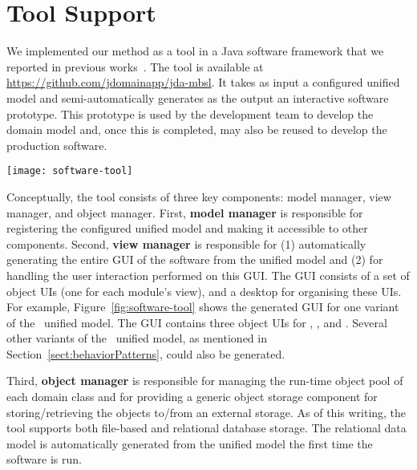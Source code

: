 \section{Tool Support}
\label{sect:tool} %

We implemented our method as a tool in a Java software framework that we reported in previous works~\cite{le_domain_2018, le_jdomainapp_2017}. The tool is available at \url{https://github.com/jdomainapp/jda-mbsl}. It takes as input a configured unified model and semi-automatically generates as the output an interactive software prototype. This prototype is used by the development team to develop the domain model and, once this is completed, may also be reused to develop the production software.

\begin{figure*}[ht]
	\centering
	\texttt{[image: software-tool]}
	\caption{The GUI of \courseman~software generated by the tool: (1) desktop, 
		(2-4) the object UIs of , , and .} %
	\label{fig:software-tool}
\end{figure*}

Conceptually, the tool consists of three key components: model manager, view manager, and object manager. First, \textbf{model manager} is responsible for registering the configured unified model and making it accessible to other components. 
Second, \textbf{view manager} is responsible for (1) automatically generating the entire GUI of the software from the unified model and (2) for handling the user interaction performed on this GUI. The GUI consists of a set of object UIs (one for each module's view), and a desktop for organising these UIs. For example, Figure~\ref{fig:software-tool} shows the generated GUI for one variant of the \courseman~unified model. The GUI contains three object UIs for , , and .
Several other variants of the \courseman~unified model, as mentioned in Section~\ref{sect:behaviorPatterns}, could also be generated. 

Third, \textbf{object manager} is responsible for managing the run-time object pool of each domain class and for providing a generic object storage component for storing/retrieving the objects to/from an external storage. As of this writing, the tool supports both file-based and relational database storage. The relational data model is automatically generated from the unified model the first time the software is run.
